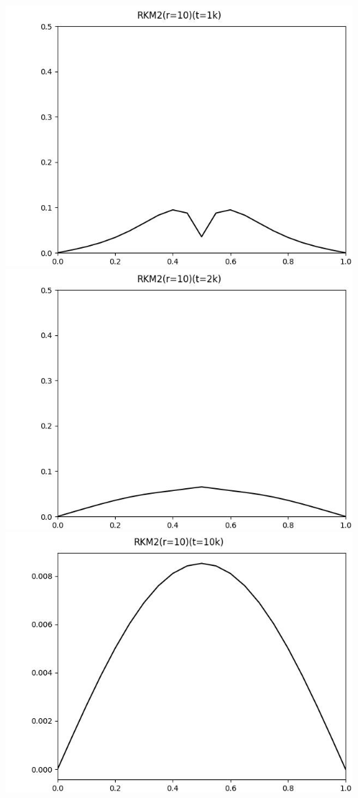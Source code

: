 \documentclass[12pt]{ctexart}
\begin{document}
\includegraphics[scale=0.35]{RKM2(r=10)(t=1k).jpg}
\includegraphics[scale=0.35]{RKM2(r=10)(t=2k).jpg}
\includegraphics[scale=0.35]{RKM2(r=10)(t=10k).jpg}
\end{document}
